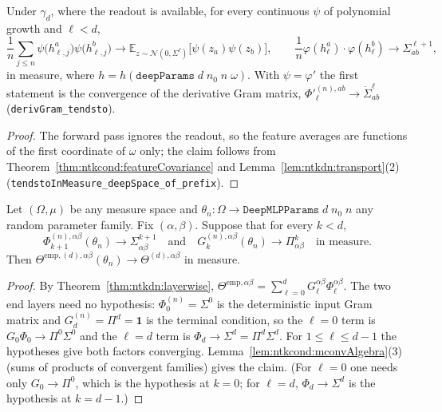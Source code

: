 \begin{theorem}\label{thm:ntkdn:forwardDeepSpace}
  \leanok
Under $\gamma_d$, where the readout is available, for every continuous $\psi$ of
polynomial growth and $\ell<d$,
\[
  \frac1n\sum_{j\le n}\psi\bigl(h_{\ell,j}^a\bigr)\psi\bigl(h_{\ell,j}^b\bigr)\longrightarrow\mathbb E_{z\sim\mathcal N(0,\Sigma^\ell)}\bigl[\psi(z_a)\psi(z_b)\bigr],\qquad\frac1n\varphi(h_\ell^a)\cdot\varphi(h_\ell^b)\longrightarrow\Sigma^{\ell+1}_{ab},
\]
in measure, where $h=h(\texttt{deepParams}\;d\;n_0\;n\;\omega)$. With $\psi=\varphi'$ the first statement is the convergence of the derivative Gram matrix, $\Phi'^{(n),ab}_\ell\to\dot\Sigma^\ell_{ab}$ (\texttt{derivGram\_tendsto}).
\end{theorem}

\begin{proof}
  \leanok
The forward pass ignores the readout, so the feature averages are functions of the first coordinate of $\omega$ only; the claim follows from Theorem~\ref{thm:ntkcond:featureCovariance} and Lemma~\ref{lem:ntkdn:transport}(2) (\texttt{tendstoInMeasure\_deepSpace\_of\_prefix}).
\end{proof}

\begin{theorem}\label{thm:ntkdn:assembly}
  \leanok
Let $(\Omega,\mu)$ be any measure space and $\theta_n:\Omega\to\texttt{DeepMLPParams}\;d\;n_0\;n$ any random parameter family. Fix $(\alpha,\beta)$. Suppose that for every $k<d$,
\[
  \Phi_{k+1}^{(n),\alpha\beta}(\theta_n)\to\Sigma^{k+1}_{\alpha\beta}\quad\text{and}\quad G_k^{(n),\alpha\beta}(\theta_n)\to\Pi^k_{\alpha\beta}\quad\text{in measure}.
\]
Then $\Theta^{\mathrm{emp},(d),\alpha\beta}(\theta_n)\to\Theta^{(d),\alpha\beta}$ in measure.
\end{theorem}

\begin{proof}
  \leanok
By Theorem~\ref{thm:ntkdn:layerwise}, $\Theta^{\mathrm{emp},\alpha\beta}=\sum_{\ell=0}^dG_\ell^{\alpha\beta}\Phi_\ell^{\alpha\beta}$. The two end layers need no hypothesis: $\Phi_0^{(n)}=\Sigma^0$ is the deterministic input Gram matrix and $G_d^{(n)}=\Pi^d=\mathbf 1$ is the terminal condition, so the $\ell=0$ term is $G_0\Phi_0\to\Pi^0\Sigma^0$ and the $\ell=d$ term is $\Phi_d\to\Sigma^d=\Pi^d\Sigma^d$. For $1\le\ell\le d-1$ the hypotheses give both factors converging. Lemma~\ref{lem:ntkcond:mconvAlgebra}(3) (sums of products of convergent families) gives the claim. (For $\ell=0$ one needs only $G_0\to\Pi^0$, which is the hypothesis at $k=0$; for $\ell=d$, $\Phi_d\to\Sigma^d$ is the hypothesis at $k=d-1$.)
\end{proof}

